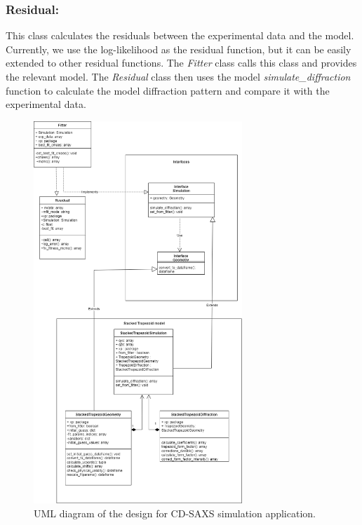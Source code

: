 \subsubsection*{\textbf{Residual:}}
This class calculates the residuals between the experimental data and the model.
Currently, we use the log-likelihood as the residual function, but it can be easily extended
to other residual functions. The \textit{Fitter} class calls this class and provides the relevant model.
The \textit{Residual} class then uses the model \textit{simulate\_diffraction} function to calculate
the model diffraction pattern and compare it with the experimental data.

\medskip

\begin{figure}[h]
    \centering
    \includegraphics[width=0.7\textwidth]{images/cdsaxs_UML.png}
    \caption{UML diagram of the design for CD-SAXS simulation application. }
    \label{fig:UML}
\end{figure}

